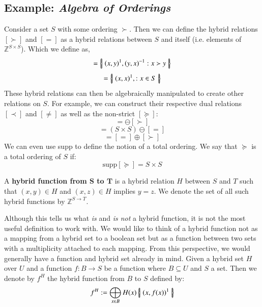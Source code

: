 \subsection{Example: \emph{Algebra of Orderings}}
Consider a set $S$ with some ordering $\succ$.
Then we can define the hybrid relations $[\succ]$ and $[=]$ as a hybrid relations between $S$ and itself 
(i.e. elements of $\mathbb{Z}^{S\times S}$).
Which we define as,
\begin{equation}
	[\succ] = \hset{ (x,y)^1, (y,x)^{-1} : x \succ y }
\end{equation}
\begin{equation}
	[=] = \hset{ (x,x)^1, : x \in S }
\end{equation}
These hybrid relations can then be algebraically manipulated to create other relations on $S$.
For example, we can construct their respective dual relations $[\prec]$ and $[\neq]$ as well as the non-strict $[\succeq]$:
\begin{equation}
	[\prec] = \ominus [\succ]
\end{equation}
\begin{equation}
	[\neq] = (S\times S) \ominus [=]
\end{equation}
\begin{equation}
	[\succeq] = [=] \oplus [\succ]
\end{equation}
We can even use supp to define the notion of a total ordering.
We say that $\succeq$ is a total ordering of $S$ if:
\begin{equation}
	\text{supp}[\succeq] = S \times S
\end{equation}


\newpage

\begin{definition}
	A \textbf{hybrid function from $\boldsymbol{S}$ to $\boldsymbol{T}$} is 
	a hybrid relation $H$ between $S$ and $T$ such that $(x,y) \in H$ and $(x,z) \in H$ implies $y=z$.
	We denote the set of all such hybrid functions by $\mathbb{Z}^{S \to T}$.
\end{definition}


Although this tells us what \emph{is} and \emph{is not} a hybrid function, it is not the most useful definition to work with. 
We would like to think of a hybrid function not as a mapping from a hybrid set to a boolean set but as
a function between two sets with a multiplicity attached to each mapping.
From this perspective, we would generally have a function and hybrid set already in mind.
Given a hybrid set $H$ over $U$ and a function $f:B \to S$ be a function where $B \subseteq U$ and $S$ a set.
Then we denote by $f^H$ the hybrid function from $B$ to $S$ defined by:
\begin{equation}
	\label{hfunc}
	f^H := \bigoplus_{x \in B} H(x) \left\{ \! \left| \;  (x, f(x) )^1  \; \right| \! \right\}
\end{equation}


